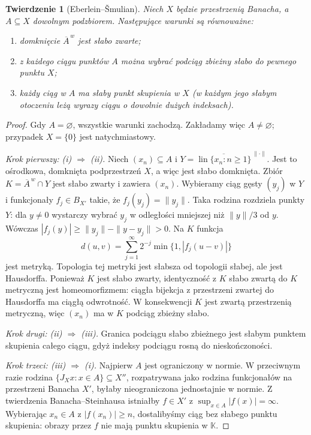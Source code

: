 \documentclass[11pt,a4paper]{article}
\numberwithin{equation}{section}
\theoremstyle{plain}
\newtheorem{twierdzenie}{Twierdzenie}[section]
\theoremstyle{definition}
\theoremstyle{remark}
\newcommand{\K}{\mathbb K}
\DeclareMathOperator{\lin}{lin}
\begin{document}
\begin{twierdzenie}[Eberlein--\v Smulian]
\label{thm:eberlein-smulian26}
Niech $X$ będzie przestrzenią Banacha, a $A\subseteq X$
dowolnym podzbiorem. Następujące warunki są równoważne:
\begin{enumerate}[label=\textup{(\roman*)}]
\item domknięcie $\overline A^{\,w}$ jest słabo zwarte;
\item z każdego ciągu punktów $A$ można wybrać podciąg
zbieżny słabo do pewnego punktu $X$;
\item każdy ciąg w $A$ ma słaby punkt skupienia w $X$
(w każdym jego słabym otoczeniu leżą wyrazy ciągu o dowolnie dużych indeksach).
\end{enumerate}
\end{twierdzenie}
\begin{proof}
Gdy $A=\varnothing$, wszystkie warunki zachodzą.
Zakładamy więc $A\ne\varnothing$; przypadek $X=\{0\}$
jest natychmiastowy.

\emph{Krok pierwszy: (i) $\Rightarrow$ (ii).}
Niech $(x_n)\subseteq A$ i
$Y=\overline{\lin\{x_n:n\ge1\}}^{\,\|\cdot\|}$.
Jest to ośrodkowa, domknięta podprzestrzeń $X$,
a więc jest słabo domknięta. Zbiór
$K=\overline A^{\,w}\cap Y$ jest słabo zwarty i zawiera $(x_n)$.
Wybieramy ciąg gęsty $(y_j)$ w $Y$ i funkcjonały
$f_j\in B_{X'}$ takie, że $f_j(y_j)=\|y_j\|$.
Taka rodzina rozdziela punkty $Y$: dla $y\ne0$ wystarczy
wybrać $y_j$ w odległości mniejszej niż $\|y\|/3$ od $y$.
Wówczas $|f_j(y)|\ge\|y_j\|-\|y-y_j\|>0$.
Na $K$ funkcja
\[
d(u,v)=\sum_{j=1}^\infty 2^{-j}\min\{1,|f_j(u-v)|\}
\]
jest metryką. Topologia tej metryki jest słabsza od topologii
słabej, ale jest Hausdorffa. Ponieważ $K$ jest słabo zwarty,
identyczność z $K$ słabo zwartą do $K$ metryczną jest
homeomorfizmem: ciągła bijekcja z przestrzeni zwartej
do Hausdorffa ma ciągłą odwrotność. W konsekwencji $K$
jest zwartą przestrzenią metryczną, więc $(x_n)$ ma w $K$
podciąg zbieżny słabo.

\emph{Krok drugi: (ii) $\Rightarrow$ (iii).}
Granica podciągu słabo zbieżnego jest słabym punktem skupienia
całego ciągu, gdyż indeksy podciągu rosną do nieskończoności.

\emph{Krok trzeci: (iii) $\Rightarrow$ (i).}
Najpierw $A$ jest ograniczony w normie. W przeciwnym razie
rodzina $\{J_Xx:x\in A\}\subseteq X''$, rozpatrywana jako
rodzina funkcjonałów na przestrzeni Banacha $X'$, byłaby
nieograniczona jednostajnie w normie. Z twierdzenia
Banacha--Steinhausa istniałby $f\in X'$ z
$\sup_{x\in A}|f(x)|=\infty$. Wybierając $x_n\in A$ z
$|f(x_n)|\ge n$, dostalibyśmy ciąg bez słabego punktu
skupienia: obrazy przez $f$ nie mają punktu skupienia
w $\K$.


\end{proof}
\end{document}
